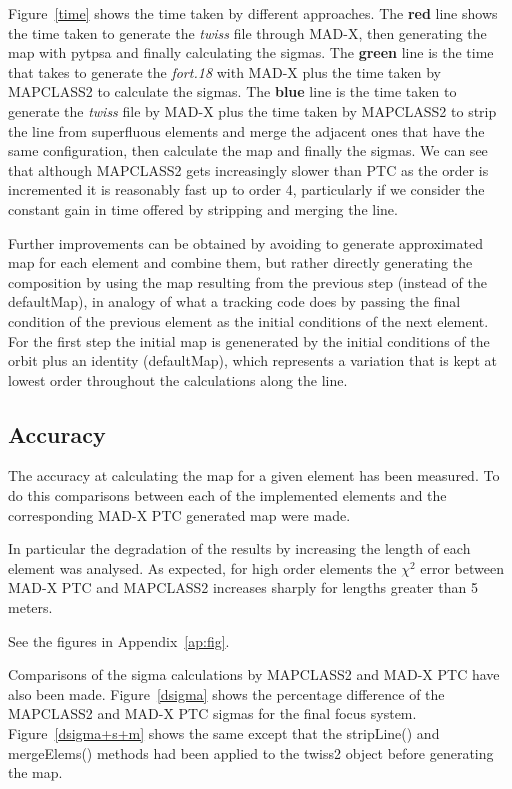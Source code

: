 \documentclass[a4paper]{cernatsnote}
\begin{document}
Figure~\ref{time} shows the time taken by different approaches. The
\textbf{red} line shows the time taken to generate the \textit{twiss}
file through MAD-X, then generating the map with pytpsa and finally
calculating the sigmas. The \textbf{green} line is the time that takes
to generate the \textit{fort.18} with MAD-X plus the time taken by
\textsc{MAPCLASS2} to calculate the sigmas. The \textbf{blue} line is
the time taken to generate the \textit{twiss} file by MAD-X plus the
time taken by \textsc{MAPCLASS2} to strip the line from superfluous
elements and merge the adjacent ones that have the same configuration, then
calculate the map and finally the sigmas. We can see that
although \textsc{MAPCLASS2} gets increasingly slower than PTC as the order is
incremented it is reasonably fast up to order 4, particularly if we consider
the constant gain in time offered by stripping and merging the line.

Further improvements can be obtained by avoiding to generate approximated map
for each element and combine them, but rather directly generating the
composition by using the map resulting from the previous step (instead of the
defaultMap), in analogy of what a tracking code does by passing the final
condition of the previous element as the initial conditions of the next
element. For the first step the initial map is genenerated by the initial
conditions of the orbit plus an identity (defaultMap), which represents a
variation that is kept at lowest order throughout the calculations along the
line.

\subsection{Accuracy}
\label{sec:accuracy}

The accuracy at calculating the map for a given element has been
measured. To do this comparisons between each of the implemented
elements and the corresponding MAD-X PTC generated map were made.

In particular the degradation of the results by increasing the length
of each element was analysed. As expected, for high order elements the
$\chi^2$ error between MAD-X PTC and \textsc{MAPCLASS2} increases
sharply for lengths greater than 5 meters.

See the figures in Appendix~\ref{ap:fig}.

Comparisons of the sigma calculations by \textsc{MAPCLASS2} and
\textsc{MAD-X PTC} have also been made. Figure~\ref{dsigma} shows the
percentage difference of the \textsc{MAPCLASS2} and \textsc{MAD-X PTC}
sigmas for the final focus system. Figure~\ref{dsigma+s+m} shows the
same except that the stripLine() and mergeElems() methods had been
applied to the twiss2 object before generating the map.
\end{document}
